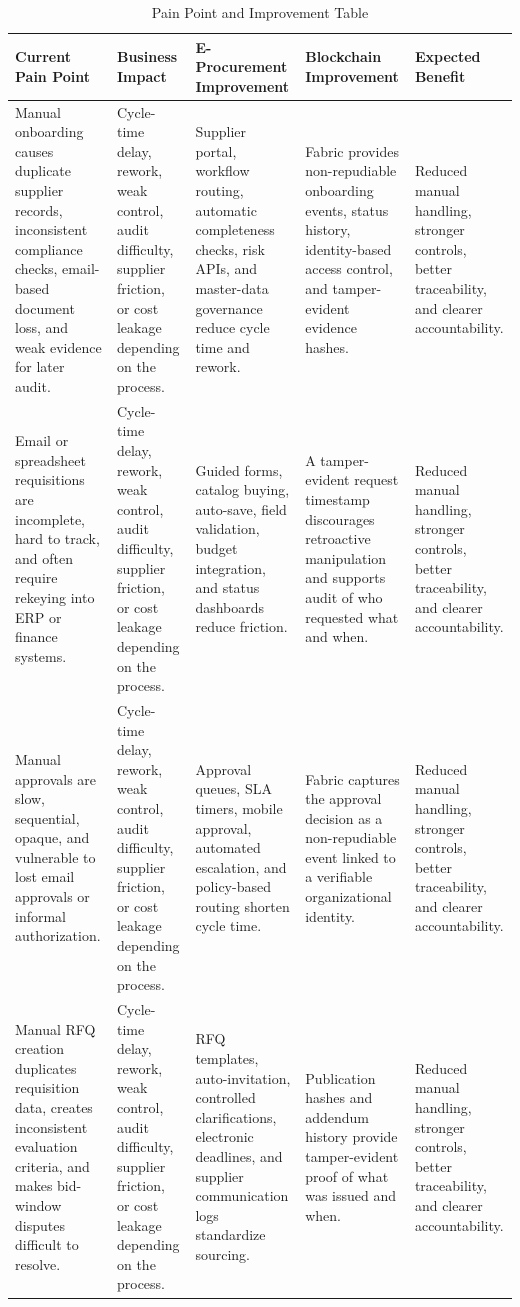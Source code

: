 \documentclass[conference]{IEEEtran}
\begin{document}
\begin{table}[t]
\caption{Pain Point and Improvement Table}
\label{tab:pain}
\tiny
\begin{tabularx}{\textwidth}{|Y|Y|Y|Y|Y|}
\hline
\textbf{Current Pain Point} & \textbf{Business Impact} & \textbf{E-Procurement Improvement} & \textbf{Blockchain Improvement} & \textbf{Expected Benefit} \\ \hline
Manual onboarding causes duplicate supplier records, inconsistent compliance checks, email-based document loss, and weak evidence for later audit. & Cycle-time delay, rework, weak control, audit difficulty, supplier friction, or cost leakage depending on the process. & Supplier portal, workflow routing, automatic completeness checks, risk APIs, and master-data governance reduce cycle time and rework. & Fabric provides non-repudiable onboarding events, status history, identity-based access control, and tamper-evident evidence hashes. & Reduced manual handling, stronger controls, better traceability, and clearer accountability. \\ \hline
Email or spreadsheet requisitions are incomplete, hard to track, and often require rekeying into ERP or finance systems. & Cycle-time delay, rework, weak control, audit difficulty, supplier friction, or cost leakage depending on the process. & Guided forms, catalog buying, auto-save, field validation, budget integration, and status dashboards reduce friction. & A tamper-evident request timestamp discourages retroactive manipulation and supports audit of who requested what and when. & Reduced manual handling, stronger controls, better traceability, and clearer accountability. \\ \hline
Manual approvals are slow, sequential, opaque, and vulnerable to lost email approvals or informal authorization. & Cycle-time delay, rework, weak control, audit difficulty, supplier friction, or cost leakage depending on the process. & Approval queues, SLA timers, mobile approval, automated escalation, and policy-based routing shorten cycle time. & Fabric captures the approval decision as a non-repudiable event linked to a verifiable organizational identity. & Reduced manual handling, stronger controls, better traceability, and clearer accountability. \\ \hline
Manual RFQ creation duplicates requisition data, creates inconsistent evaluation criteria, and makes bid-window disputes difficult to resolve. & Cycle-time delay, rework, weak control, audit difficulty, supplier friction, or cost leakage depending on the process. & RFQ templates, auto-invitation, controlled clarifications, electronic deadlines, and supplier communication logs standardize sourcing. & Publication hashes and addendum history provide tamper-evident proof of what was issued and when. & Reduced manual handling, stronger controls, better traceability, and clearer accountability. \\ \hline

\end{tabularx}
\end{table}
\end{document}
